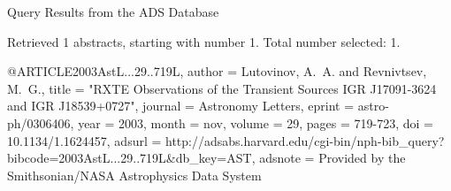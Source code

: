 Query Results from the ADS Database


Retrieved 1 abstracts, starting with number 1.  Total number selected: 1.

@ARTICLE{2003AstL...29..719L,
   author = {{Lutovinov}, A.~A. and {Revnivtsev}, M.~G.},
    title = "{RXTE Observations of the Transient Sources IGR J17091-3624 and IGR J18539+0727}",
  journal = {Astronomy Letters},
   eprint = {astro-ph/0306406},
     year = 2003,
    month = nov,
   volume = 29,
    pages = {719-723},
      doi = {10.1134/1.1624457},
   adsurl = {http://adsabs.harvard.edu/cgi-bin/nph-bib_query?bibcode=2003AstL...29..719L&db_key=AST},
  adsnote = {Provided by the Smithsonian/NASA Astrophysics Data System}
}


